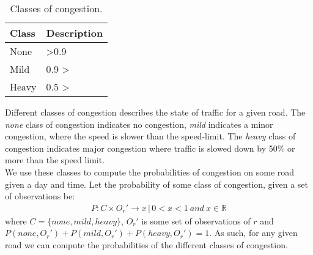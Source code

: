\begin{table}[]
\centering
\caption{Classes of congestion.}
\label{tab:congestion-classes}
\begin{tabular}{l|l}
\textbf{Class} & \textbf{Description} \\ \hline
None           & \textgreater0.9      \\
Mild           & 0.9 \textgreater     \\
Heavy          & 0.5 \textgreater    
\end{tabular}
\end{table}
Different classes of congestion describes the state of traffic for a given road. The \emph{none} class of congestion indicates no congestion, \emph{mild} indicates a minor congestion, where the speed is slower than the speed-limit. The \emph{heavy} class of congestion indicates major congestion where traffic is slowed down by 50\% or more than the speed limit.\\
We use these classes to compute the probabilities of congestion on some road given a day and time.
Let the probability of some class of congestion, given a set of observations be:
\begin{align*}
P: C \times O_r' \rightarrow x \,|\, 0 < x < 1 \: and \: x \in \mathbb R
\end{align*}
where $C=\{none, mild, heavy\}$, $O_r'$ is some set of observations of $r$ and $P(none, O_r')+P(mild, O_r')+P(heavy, O_r') = 1$.
As such, for any given road we can compute the probabilities of the different classes of congestion. 
